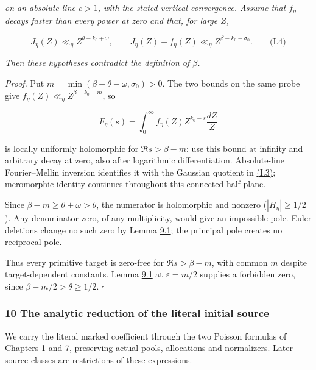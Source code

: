 \emph{on an absolute line \(c>1\), with the stated vertical convergence. Assume that \(f_\eta\) decays faster than every power at zero and that, for large \(Z\), \hypertarget{init:two-probe-bounds}{}\label{init:two-probe-bounds}}

\[
J_\eta(Z)\ll_\eta Z^{\theta-k_0+\omega},\qquad
 J_\eta(Z)-f_\eta(Z)\ll_\eta Z^{\beta-k_0-\sigma_0}.
 \qquad\text{(I.4)}
\]

\emph{Then these hypotheses contradict the definition of \(\beta\).}

\emph{Proof.} Put \(m=\min(\beta-\theta-\omega,\sigma_0)>0\). The two bounds on the same probe give \(f_\eta(Z)\ll_\eta Z^{\beta-k_0-m}\), so

\[
F_\eta(s)=\int_0^\infty f_\eta(Z)Z^{k_0-s}\frac{dZ}{Z}
\]

is locally uniformly holomorphic for \(\Re s>\beta-m\): use this bound at infinity and arbitrary decay at zero, also after logarithmic differentiation. Absolute-line Fourier--Mellin inversion identifies it with the Gaussian quotient in \protect\hyperlink{init:signal}{(I.3)}; meromorphic identity continues throughout this connected half-plane.

Since \(\beta-m\ge\theta+\omega>\theta\), the numerator is holomorphic and nonzero (\(|H_\eta|\ge1/2\)). Any denominator zero, of any multiplicity, would give an impossible pole. Euler deletions change no such zero by Lemma \protect\hyperlink{init:primitive-supremum}{9.1}; the principal pole creates no reciprocal pole.

Thus every primitive target is zero-free for \(\Re s>\beta-m\), with common \(m\) despite target-dependent constants. Lemma \protect\hyperlink{init:primitive-supremum}{9.1} at \(\varepsilon=m/2\) supplies a forbidden zero, since \(\beta-m/2>\theta\ge1/2\). \(\square\)

\hypertarget{sr:chapter}{}

\label{sr:chapter}

\hypertarget{the-analytic-reduction-of-the-literal-initial-source}{%
\subsubsection{10 The analytic reduction of the literal initial source}\label{the-analytic-reduction-of-the-literal-initial-source}}

We carry the literal marked coefficient through the two Poisson formulas of Chapters 1 and 7, preserving actual pools, allocations and normalizers. Later source classes are restrictions of these expressions.

